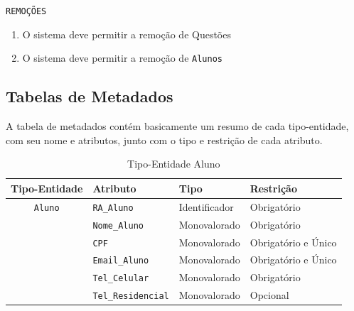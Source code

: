 \documentclass[12pt,a4paper]{article}
\begin{document}
\vspace{0.5cm}
\begin{center}
    \texttt{REMOÇÕES}
\end{center}
\begin{enumerate}
    \item O sistema deve permitir a remoção de Questões
    \item O sistema deve permitir a remoção de \texttt{Alunos}
\end{enumerate}
\subsection{Tabelas de Metadados}
A tabela de metadados contém basicamente um resumo de cada tipo-entidade, com seu nome e atributos, junto com o tipo e restrição de cada atributo.

\begin{table}[h]
  \centering
  \caption{Tipo-Entidade Aluno}
    \begin{tabular}{|c|c|l|l|l|}
    \toprule\hline
    \multicolumn{2}{|c|}{\textbf{Tipo-Entidade}} & \textbf{Atributo} & \textbf{Tipo} & \textbf{Restrição} \\\hline
    \midrule
    \multicolumn{2}{|c|}{\texttt{Aluno}} & \texttt{RA\_Aluno} & Identificador & Obrigatório \\
    \midrule
    \multicolumn{2}{|c|}{} & \texttt{Nome\_Aluno} & Monovalorado & Obrigatório \\
    \midrule
    \multicolumn{2}{|c|}{} & \texttt{CPF}   & Monovalorado & Obrigatório e Único \\
    \midrule
    \multicolumn{2}{|c|}{} & \texttt{Email\_Aluno} & Monovalorado & Obrigatório e Único \\
    \midrule
    \multicolumn{2}{|c|}{} & \texttt{Tel\_Celular} & Monovalorado & Obrigatório \\
    \midrule
    \multicolumn{2}{|c|}{} & \texttt{Tel\_Residencial} & Monovalorado & Opcional \\
    \bottomrule\hline
    \end{tabular}%
  \label{tab:meta_aluno}%
\end{table}%
\end{document}
